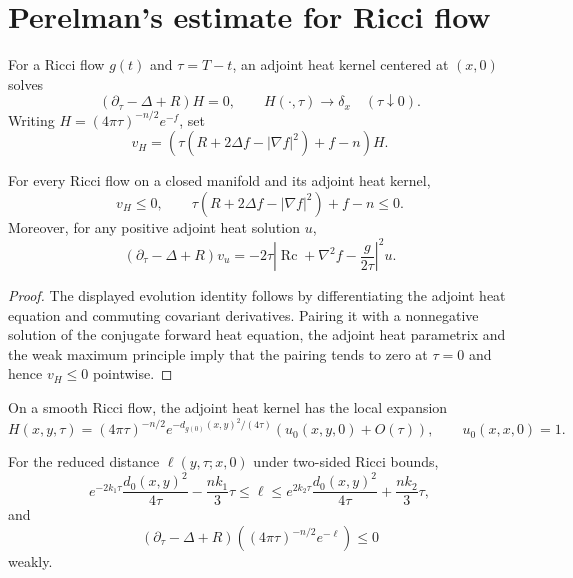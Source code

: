 \section{Perelman's estimate for Ricci flow}

\begin{definition}
\label{def:chow-ii-ch16-adjoint-heat-kernel}
For a Ricci flow $g(t)$ and $\tau=T-t$, an adjoint heat kernel centered at
$(x,0)$ solves
\[
\left(\partial_\tau-\Delta+R\right)H=0,
\qquad H(\cdot,\tau)\longrightarrow\delta_x\quad(\tau\downarrow0).
\]
Writing $H=(4\pi\tau)^{-n/2}e^{-f}$, set
\[
v_H=\left(\tau(R+2\Delta f-|\nabla f|^2)+f-n\right)H.
\]
\end{definition}

\begin{theorem}
\label{thm:chow-ii-ch16-perelman-harnack}
For every Ricci flow on a closed manifold and its adjoint heat kernel,
\[
v_H\le0,\qquad
\tau(R+2\Delta f-|\nabla f|^2)+f-n\le0.
\]
Moreover, for any positive adjoint heat solution $u$,
\[
\left(\partial_\tau-\Delta+R\right)v_u
 =-2\tau\left|\operatorname{Rc}+\nabla^2f-\frac{g}{2\tau}\right|^2u.
\]
\end{theorem}
\begin{proof}
\sketch The displayed evolution identity follows by differentiating the adjoint heat
equation and commuting covariant derivatives. Pairing it with a nonnegative
solution of the conjugate forward heat equation, the adjoint heat parametrix
and the weak maximum principle imply that the pairing tends to zero at
$\tau=0$ and hence $v_H\le0$ pointwise.
\end{proof}

\begin{theorem}
\label{thm:chow-ii-ch16-adjoint-parametrix}
On a smooth Ricci flow, the adjoint heat kernel has the local expansion
\[
H(x,y,\tau)=(4\pi\tau)^{-n/2}e^{-d_{g(0)}(x,y)^2/(4\tau)}
 (u_0(x,y,0)+O(\tau)),\qquad u_0(x,x,0)=1.
\]
\end{theorem}

\begin{lemma}
\label{lem:chow-ii-ch16-reduced-distance-subsolution}
For the reduced distance $\ell(y,\tau;x,0)$ under two-sided Ricci bounds,
\[
e^{-2k_1\tau}\frac{d_0(x,y)^2}{4\tau}-\frac{nk_1}{3}\tau
\le\ell\le e^{2k_2\tau}\frac{d_0(x,y)^2}{4\tau}+\frac{nk_2}{3}\tau,
\]
and
\[
\left(\partial_\tau-\Delta+R\right)
 \left((4\pi\tau)^{-n/2}e^{-\ell}\right)\le0
\]
weakly.
\end{lemma}

